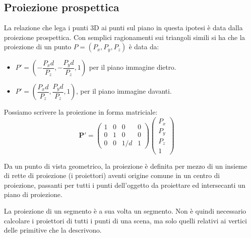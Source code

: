 \documentclass[a4paper, 10pt]{article}
\renewcommand{\vec}{\bm}
\begin{document}
	\subsection{Proiezione prospettica}
		La relazione che lega i punti 3D ai punti sul piano in questa
		ipotesi è data dalla proiezione prospettica. Con semplici
		ragionamenti sui triangoli simili si ha che la proiezione di un
		punto $ P = (P_x, P_y, P_z) $ è data da:
		\begin{itemize}
			\item  $ P' = (-\dfrac{P_x d}{P_z}, -\dfrac{P_y d}{P_z}, 1) $ per il piano immagine dietro.
			\item $ P' = (\dfrac{P_x d}{P_z}, \dfrac{P_y d}{P_z}, 1) $, per il piano immagine davanti.
		\end{itemize}
		Possiamo scrivere la proiezione in forma matriciale:
		\[
			\vec{P'} =
			\begin{pmatrix}
				1 & 0 & 0 & 0 \\
				0 & 1 & 0 & 0 \\
				0 & 0 & 1/d & 1 
			\end{pmatrix}
			\begin{pmatrix}
				P_x \\
				P_y \\
				P_z \\
				1
			\end{pmatrix}
		\]
		
		Da un punto di vista geometrico, la proiezione è
		definita per mezzo di un insieme di rette di proiezione
		(i proiettori) aventi origine comune in un centro di
		proiezione, passanti per tutti i punti dell’oggetto da
		proiettare ed intersecanti un piano di proiezione.
		
		\noindent
		La proiezione di un segmento è a sua volta un
		segmento. Non è quindi necessario calcolare i proiettori di tutti i
		punti di una scena, ma solo quelli relativi ai vertici delle
		primitive che la descrivono.
		
\end{document}
